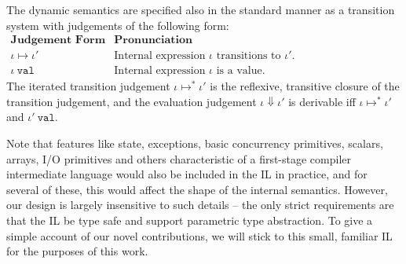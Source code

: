 \noindent
The dynamic semantics are specified also in the standard manner as a transition system with  judgements of the following form:
\\[1ex]
$
\begin{array}{ll}
\textbf{Judgement Form} & \textbf{Pronunciation}\\
\iota \mapsto \iota' & \text{Internal expression $\iota$ transitions to $\iota'$.}\\
\iota~\mathtt{val} & \text{Internal expression $\iota$ is a value.}
\end{array}
$
\\[1ex]
The iterated transition judgement $\iota \mapsto^{*} \iota'$ is the reflexive, transitive closure of the transition judgement, and the evaluation judgement $\iota \Downarrow \iota'$ is derivable iff $\iota \mapsto^{*} \iota'$ and $\iota'~\mathtt{val}$. 

Note that features like state, exceptions, basic concurrency primitives, scalars, arrays, I/O primitives and others characteristic of a first-stage compiler intermediate language would also be included in the IL in practice, and for several of these, this would affect the shape of the internal semantics. However, our design is largely insensitive to such details -- the only strict requirements are that the IL be type safe and support parametric type abstraction. To give a simple account of our novel contributions, we will stick to this small, familiar IL for the purposes of this work. %



